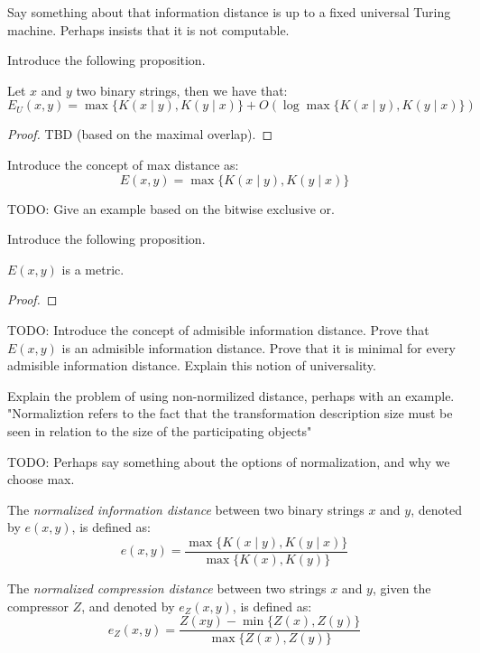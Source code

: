 {\color{red} Say something about that information distance is up to a fixed universal Turing machine. Perhaps insists that it is not computable.}

{\color{red} Introduce the following proposition.}

\begin{proposition}
Let $x$ and $y$ two binary strings, then we have that:
\[
E_U(x, y) = \max\{ K(x \mid y), K(y \mid x) \} + O ( \log \max\{ K(x \mid y), K(y \mid x) \}) 
\]
\end{proposition}
\begin{proof}
{\color{red} TBD (based on the maximal overlap).}
\end{proof}

{\color{red} Introduce the concept of max distance as:}
\[
E(x, y) = \max\{ K(x \mid y), K(y \mid x) \}
\]

\begin{example}
{\color{red} TODO: Give an example based on the bitwise exclusive or.}
\end{example}

{\color{red} Introduce the following proposition.}

\begin{proposition}
{\color{red} $E(x, y)$ is a metric.}
\end{proposition}
\begin{proof}
\end{proof}

{\color{red} TODO: Introduce the concept of admisible information distance. Prove that $E(x, y)$ is an admisible information distance. Prove that it is minimal for every admisible information distance. Explain this notion of universality.}

{\color{red} Explain the problem of using non-normilized distance, perhaps with an example. "Normaliztion refers to the fact that the transformation description size must be seen in relation to the size of the participating objects"}

{\color{red} TODO: Perhaps say something about the options of normalization, and why we choose max.}

\begin{definition}
The \emph{normalized information distance} between two binary strings $x$ and $y$, denoted by $e(x, y)$, is defined as:
\[
e(x, y) = \frac{\max\{ K(x \mid y), K(y \mid x) \}}{\max \{ K(x), K(y) \} }
\]
\end{definition}

\begin{definition}
The \emph{normalized compression distance} between two strings $x$ and $y$, given the compressor $Z$, and denoted by $e_Z(x, y)$, is defined as:
\[
e_Z(x, y) = \frac{ Z(xy) - \min\{ Z(x), Z(y) \}}{\max \{ Z(x), Z(y) \} }
\]
\end{definition}

